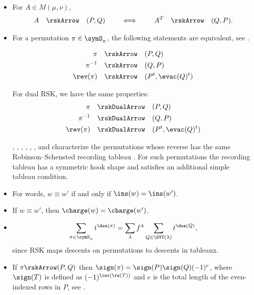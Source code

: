 \begin{itemize}

\item For $A \in M(\mu,\nu)$,
\[
A \quad \rskArrow \quad (P,Q) \qquad  \iff  \qquad A^{T} \quad \rskArrow \quad (Q,P).
\]

\item
For a permutation $\pi \in \symS_n$, the following statements are equivalent, see
\cite[A.1.2.11]{StanleyEC2}.

\begin{align}
\pi \quad &\rskArrow \quad (P,Q) \\
\pi^{-1} \quad &\rskArrow \quad (Q,P) \\
\rev(\pi) \quad &\rskArrow \quad (P^t, \evac(Q)^t)
\end{align}

For dual RSK, we have the same properties:
\begin{align}
\pi \quad &\rskDualArrow \quad (P,Q) \\
\pi^{-1} \quad &\rskDualArrow \quad (Q,P) \\
\rev(\pi) \quad &\rskDualArrow \quad (P^t, \evac(Q)^t)
\end{align}

, , ,
, , , and
 characterize the permutations whose reverse has the
same Robinson--Schensted recording tableau \cite{ErvinJacksonLaneLeeNguyenODonohueVaughan2022}.
For such permutations the recording tableau has a symmetric hook shape and
satisfies an additional simple tableau condition.


\item For words, $w \equiv w'$ if and only if $\ins(w)=\ins(w')$.

\item If $w \equiv w'$, then $\charge(w)=\charge(w')$.

\item
\[
\sum_{\sigma \in \symS_n} t^{\des(\sigma)} = \sum_{\lambda}
f^{\lambda} \sum_{Q\in\SYT(\lambda)} t^{\des(Q)},
\]
since RSK maps descents on permutations to descents in tableaux.


\item

If $\pi \rskArrow (P,Q)$ then $\sign(\pi) = \sign(P)\sign(Q)(-1)^e$,
where $\sign(T)$ is defined as $(-1)^{\inv(\rw(T))}$ and $e$ is the total length
of the even-indexed rows in $P$, see \cite{Reifegerste2004}.
\end{itemize}



